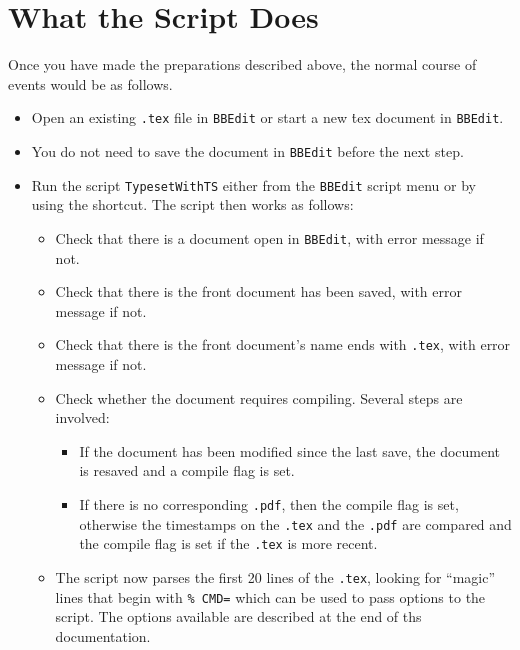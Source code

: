\documentclass[11pt]{amsart}
\begin{document}
\section{What the Script Does}
Once you have made the preparations described above, the normal course of events would be as follows.
\begin{itemize}
\item Open an existing {\tt.tex} file in {\tt BBEdit} or start a new {\.tex} document in {\tt BBEdit}. 
\item You do not need to save the document in {\tt BBEdit} before the next step. 
\item Run the script {\tt TypesetWithTS} either from the {\tt BBEdit} script menu or by using the shortcut. The script then works as follows:
\begin{itemize} %
\item Check that there is a document open in {\tt BBEdit}, with error message if not.
\item Check that there is the front document has been saved, with error message if not.
\item Check that there is the front document's name ends with {\tt.tex}, with error message if not.
\iffalse
\item Check whether the document has a magic line of the form
\begin{verbatim}
% !TEX TS-program = ...
\end{verbatim}
in the first 20 lines. If not, it inserts
\begin{verbatim}
% !TEX TS-program = pdflatex
\end{verbatim}
and bails out with a message to edit this line to use a tex program or engine appropriate to your needs before proceeding.
\fi
\item Check whether the document requires  compiling. Several steps are involved:
\begin{itemize}
\item If the document has been modified since the last save, the document is resaved and a compile flag is set.
\item If there is no corresponding {\tt .pdf}, then the compile flag is set, otherwise the timestamps on the {\tt.tex} and the {\tt.pdf} are compared and  the compile flag is set if the {\tt.tex} is more recent.
\end{itemize} %
\item The script now parses the first 20 lines of the {\tt.tex}, looking for ``magic'' lines that begin with \verb|% CMD=| which can be used to pass options to the script. The options available are described at the end of ths documentation. 

\end{itemize}
\end{itemize}
\end{document}

